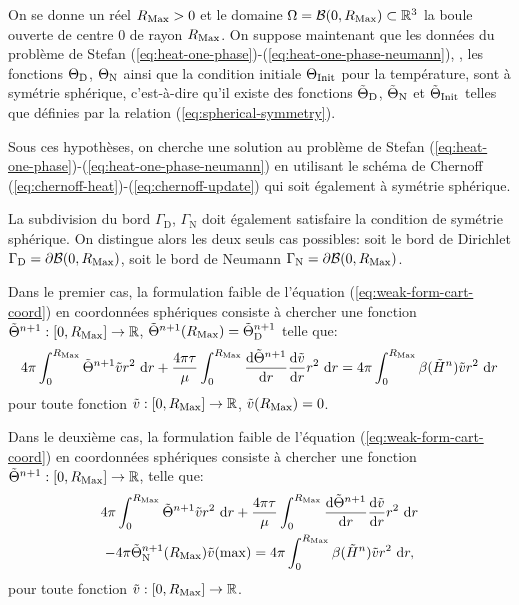 On se donne un réel $R_\mathrm{Max} > 0$ et le domaine $\Omega = \mathcal B(0,
R_\mathrm{Max}) \subset \mathbb R^3$ la boule ouverte de centre $0$ de rayon
$R_\mathrm{Max}$. On suppose maintenant que les données du problème de Stefan
(\ref{eq:heat-one-phase})-(\ref{eq:heat-one-phase-neumann}), \ie, les
fonctions $\Theta_\mathrm{D}$, $\Theta_\mathrm{N}$ ainsi
que la condition initiale $\Theta_\text{Init}$ pour la température, sont à
symétrie sphérique, c'est-à-dire qu'il existe des fonctions $\tilde
{\Theta}_\mathrm{D}$, $\tilde{\Theta}_\mathrm{N}$ et $\tilde{\Theta}_\text{Init}$
telles que définies par la relation (\ref{eq:spherical-symmetry}).

Sous ces hypothèses, on cherche une solution au problème de Stefan
(\ref{eq:heat-one-phase})-(\ref{eq:heat-one-phase-neumann}) en
utilisant le schéma de Chernoff
(\ref{eq:chernoff-heat})-(\ref{eq:chernoff-update}) qui soit également
à symétrie sphérique.

La subdivision du bord $\Gamma_\mathrm{D}$, $\Gamma_\mathrm{N}$ doit
également satisfaire la condition de symétrie sphérique. On distingue alors les
deux seuls cas possibles:
soit le bord de Dirichlet $\Gamma_\mathrm{D} = \partial\mathcal
B(0,R_\mathrm{Max})$, soit le bord de Neumann $\Gamma_\mathrm{N} =
\partial\mathcal B(0,R_\mathrm{Max})$.

Dans le premier cas, la formulation faible de l'équation
(\ref{eq:weak-form-cart-coord}) en coordonnées sphériques consiste à
chercher une fonction $\tilde {\Theta}^{n+1}:[0,R_\mathrm{Max}] \to \mathbb
R$, $\tilde{\Theta}^{n+1}(R_\mathrm{Max}) =
\tilde{\Theta}_{\mathrm{D}}^{n+1}$ telle que:
\begin{multline}\label{eq:weak-form-spher-coord-dirichlet}
  4\pi\int_0^{\rmax} \tilde \temperature^{n+1}\tilde v r^2\,\intd{r}
  + \frac{4\pi\tau}{\mu}\int_0^{\rmax} \frac{\mathrm d %
    \tilde \temperature^{n+1}}{\mathrm d r} \frac{\mathrm d \tilde v}{\mathrm d %
    r}r^2\,\intd{r}  %
  = 4\pi\int_0^{\rmax} \beta(\tilde \enthalpydensity^n)\tilde v r^2\,\intd{r}
\end{multline}
pour toute fonction $\tilde v:[0,R_\mathrm{Max}]\to\mathbb R$, $\tilde v(R_\mathrm{Max})
= 0$.

Dans le deuxième cas, la formulation faible de l'équation
(\ref{eq:weak-form-cart-coord}) en coordonnées sphériques consiste à
chercher une fonction $\tilde {\Theta}^{n+1}:[0,R_\mathrm{Max}] \to \mathbb
R$, telle que:
\begin{multline}\label{eq:weak-form-spher-coord-neumann}
  4\pi\int_0^{\rmax} \tilde \temperature^{n+1}\tilde v r^2\,\intd{r}
  + \frac{4\pi\tau}{\mu}\int_0^{\rmax} \frac{\mathrm d %
    \tilde \temperature^{n+1}}{\mathrm d r} \frac{\mathrm d \tilde v}{\mathrm d %
    r}r^2\,\intd{r} \\
  - 4\pi\tilde\temperature^{n+1}_\mathrm{N}(\rmax)\tilde v(\max) %
  = 4\pi\int_0^{\rmax} \beta(\tilde \enthalpydensity^n)\tilde v r^2\,\intd{r},
\end{multline}
pour toute fonction $\tilde v:[0,R_\mathrm{Max}]\to\mathbb R$.

